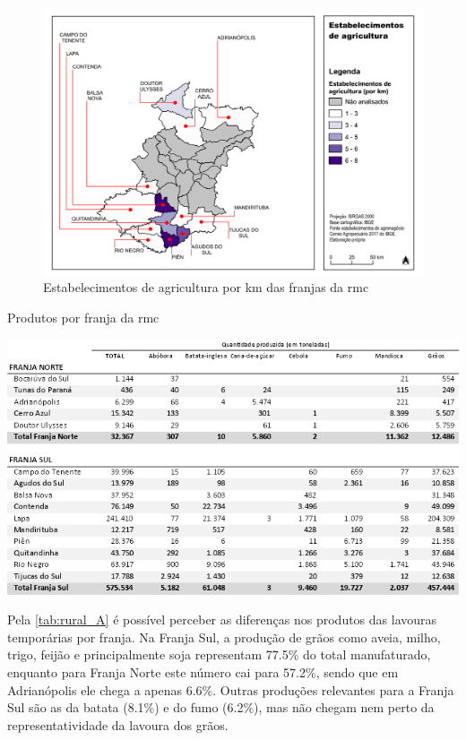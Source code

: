 	\begin{landscape}
		\begin{figure}
			\centering
			\caption{Estabelecimentos de agricultura por km das franjas da \gls{rmc}}
			\label{fig:qtdekmagro}
			\includegraphics[width=0.85\linewidth]{../gis/produtos/RMC_censorural_QTD_ESTAB_KM_AGRO}
		\end{figure}
	\end{landscape}
	
	\begin{table}
		\centering
		\caption{Produtos por franja da \gls{rmc}}
		\includegraphics[width=1\linewidth]{img/rural_A}
		\label{tab:rural_A}
	\end{table}

	Pela \autoref{tab:rural_A} é possível perceber as diferenças nos produtos das lavouras temporárias por franja. Na Franja Sul, a produção de grãos como aveia, milho, trigo, feijão e principalmente soja representam 77.5\% do total manufaturado, enquanto para Franja Norte este número cai para 57.2\%, sendo que em Adrianópolis ele chega a apenas 6.6\%. Outras produções relevantes para a Franja Sul são as da batata (8.1\%) e do fumo (6.2\%), mas não chegam nem perto da representatividade da lavoura dos grãos.

